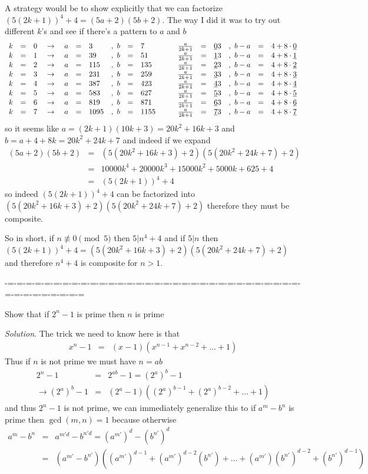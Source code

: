 \documentclass[aps,preprint,preprintnumbers,nofootinbib,showpacs,prd]{revtex4-1}
\newcommand{\nbea}{\begin{eqnarray*}}
\newcommand{\neea}{\end{eqnarray*}}
\begin{document}
A strategy would be to show explicitly that we can factorize $(5(2k+1))^4 + 4 = (5a + 2)(5b + 2)$. The way I did it was to try out different $k$'s and see if there's a pattern to $a$ and $b$
%
\nbea
\begin{array}{r c l c r c l r c l c r c l r c l}
k &=& 0 & ~\to~ & a &=& 3 &,~b&=&7 &~~~& \frac{a}{2k+1} &=& \underline{0}3 &,~b-a &=& 4  + 8\cdot \underline{0}\\
k &=& 1 & ~\to~ & a &=& 39 &,~b&=&51 &~~~& \frac{a}{2k+1} &=& \underline{1}3 &,~b-a &=& 4 + 8\cdot \underline{1} \\
k &=& 2 & ~\to~ & a &=& 115 &,~b&=&135 &~~~& \frac{a}{2k+1} &=& \underline{2}3 &,~b-a &=& 4  + 8\cdot \underline{2}\\
k &=& 3 & ~\to~ & a &=& 231 &,~b&=&259 &~~~& \frac{a}{2k+1} &=& \underline{3}3 &,~b-a &=& 4  + 8\cdot \underline{3}\\
k &=& 4 & ~\to~ & a &=& 387 &,~b&=&423 &~~~& \frac{a}{2k+1} &=& \underline{4}3 &,~b-a &=& 4  + 8\cdot \underline{4}\\
k &=& 5 & ~\to~ & a &=& 583 &,~b&=&627 &~~~& \frac{a}{2k+1} &=& \underline{5}3 &,~b-a &=& 4  + 8\cdot \underline{5}\\
k &=& 6 & ~\to~ & a &=& 819 &,~b&=&871 &~~~& \frac{a}{2k+1} &=& \underline{6}3 &,~b-a &=& 4  + 8\cdot \underline{6}\\
k &=& 7 & ~\to~ & a &=& 1095 &,~b&=&1155 &~~~& \frac{a}{2k+1} &=& \underline{7}3 &,~b-a &=& 4  + 8\cdot \underline{7}
\end{array}
\neea
%
so it seems like $a = (2k+1)(10k+3) = 20k^2+16k+3$ and $b = a + 4 + 8k= 20k^2+24k+7$ and indeed if we expand
%
\nbea
(5a + 2)(5b + 2) & = & (5(20k^2+16k+3) + 2)(5(20k^2+24k+7) + 2) \\
& = & 10000k^4+20000k^3+15000k^2+5000k+625 + 4 \\
& = & (5(2k+1))^4 + 4
\neea
%
so indeed $(5(2k+1))^4 + 4$ can be factorized into $(5(20k^2+16k+3) + 2)(5(20k^2+24k+7) + 2)$ therefore they must be composite.

So in short, if $n \not\equiv 0 \pmod{5}$ then $5|n^4 + 4$ and if $5|n$ then $(5(2k+1))^4 + 4 = (5(20k^2+16k+3) + 2)(5(20k^2+24k+7) + 2)$ and therefore $n^4 + 4$ is composite for $n>1$.

-=-=-=-=-=-=-=-=-=-=-=-=-=-=-=-=-=-=-=-=-=-=-=-=-=-=-=-=-=-=-=-=-=-=-=-=-=-=-=-=-=

Show that if $2^n - 1$ is prime then $n$ is prime

{\it Solution}. The trick we need to know here is that
%
\nbea
x^n - 1 & = & (x - 1)(x^{n-1} + x^{n-2} + \dots + 1)
\neea
%
Thus if $n$ is not prime we must have $n = ab$
%
\nbea
2^n - 1 & = & 2^{ab} - 1 = (2^a)^b - 1 \\
\to (2^a)^b - 1 & = & (2^a - 1)((2^a)^{b-1} + (2^a)^{b-2} + \dots + 1)
\neea
%
and thus $2^n - 1$ is not prime, we can immediately generalize this to if $a^m - b^n$ is prime then $\gcd(m,n) = 1$ because otherwise
%
\nbea
a^m - b^n & = & a^{m'd} - b^{n'd} = (a^{m'})^d - (b^{n'})^d \\
& = & \left (a^{m'} - b^{n'} \right ) \left ((a^{m'})^{d-1} + (a^{m'})^{d-2} (b^{n'})+ \dots + (a^{m'})(b^{n'})^{d-2} + (b^{n'})^{d-1} \right )
\neea
%
\end{document}
